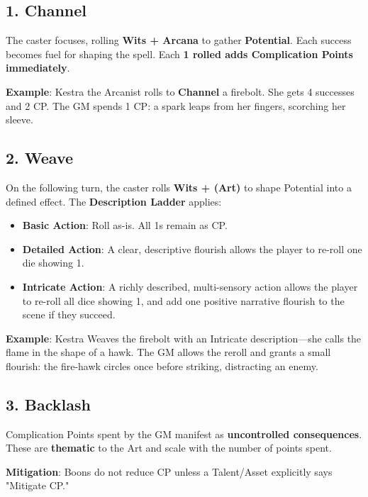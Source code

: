 \subsection*{1. Channel}

The caster focuses, rolling \textbf{Wits + Arcana} to gather \textbf{Potential}. Each success becomes fuel for shaping the spell. Each \textbf{1 rolled adds Complication Points immediately}.

\textbf{Example}: Kestra the Arcanist rolls to \textbf{Channel} a firebolt. She gets 4 successes and 2 CP. The GM spends 1 CP: a spark leaps from her fingers, scorching her sleeve.

\subsection*{2. Weave}

On the following turn, the caster rolls \textbf{Wits + (Art)} to shape Potential into a defined effect. The \textbf{Description Ladder} applies:

\begin{itemize}
    \item \textbf{Basic Action}: Roll as-is. All 1s remain as CP.
    \item \textbf{Detailed Action}: A clear, descriptive flourish allows the player to re-roll one die showing 1.
    \item \textbf{Intricate Action}: A richly described, multi-sensory action allows the player to re-roll all dice showing 1, and add one positive narrative flourish to the scene if they succeed.
\end{itemize}

\textbf{Example}: Kestra Weaves the firebolt with an Intricate description---she calls the flame in the shape of a hawk. The GM allows the reroll and grants a small flourish: the fire-hawk circles once before striking, distracting an enemy.

\subsection*{3. Backlash}

Complication Points spent by the GM manifest as \textbf{uncontrolled consequences}. These are \textbf{thematic} to the Art and scale with the number of points spent.

\textbf{Mitigation}: Boons do not reduce CP unless a Talent/Asset explicitly says "Mitigate CP."


